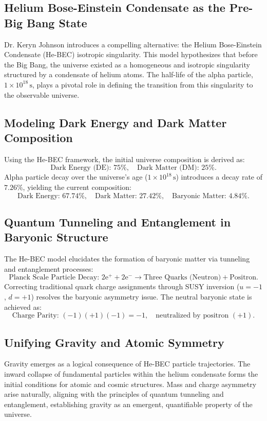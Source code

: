 \documentclass{article}
\theoremstyle{plain}
\begin{document}
\subsection{Helium Bose-Einstein Condensate as the Pre-Big Bang State}
Dr. Keryn Johnson introduces a compelling alternative: the Helium Bose-Einstein Condensate (He-BEC) isotropic singularity. This model hypothesizes that before the Big Bang, the universe existed as a homogeneous and isotropic singularity structured by a condensate of helium atoms. The half-life of the alpha particle, $1 \times 10^{18} \, \mathrm{s}$, plays a pivotal role in defining the transition from this singularity to the observable universe.

\subsection{Modeling Dark Energy and Dark Matter Composition}
Using the He-BEC framework, the initial universe composition is derived as:
\[
\text{Dark Energy (DE): } 75\%, \quad \text{Dark Matter (DM): } 25\%.
\]
Alpha particle decay over the universe's age ($1 \times 10^{18} \, \mathrm{s}$) introduces a decay rate of $7.26\%$, yielding the current composition:
\[
\text{Dark Energy: } 67.74\%, \quad \text{Dark Matter: } 27.42\%, \quad \text{Baryonic Matter: } 4.84\%.
\]

\subsection{Quantum Tunneling and Entanglement in Baryonic Structure}
The He-BEC model elucidates the formation of baryonic matter via tunneling and entanglement processes:
\[
\text{Planck Scale Particle Decay: } 2\text{e}^{+} + 2\text{e}^{-} \to \text{Three Quarks (Neutron)} + \text{Positron}.
\]
Correcting traditional quark charge assignments through SUSY inversion ($u = -1$, $d = +1$) resolves the baryonic asymmetry issue. The neutral baryonic state is achieved as:
\[
\text{Charge Parity: } (-1)(+1)(-1) = -1, \quad \text{neutralized by positron } (+1).
\]

\subsection{Unifying Gravity and Atomic Symmetry}
Gravity emerges as a logical consequence of He-BEC particle trajectories. The inward collapse of fundamental particles within the helium condensate forms the initial conditions for atomic and cosmic structures. Mass and charge asymmetry arise naturally, aligning with the principles of quantum tunneling and entanglement, establishing gravity as an emergent, quantifiable property of the universe.
\end{document}

